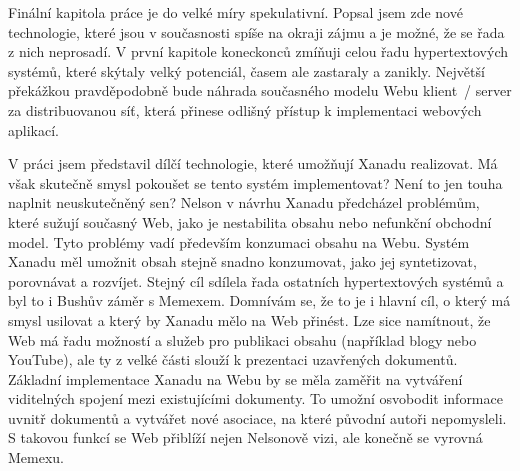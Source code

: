 Finální kapitola práce je do velké míry spekulativní. Popsal jsem zde nové technologie, které jsou v současnosti spíše na okraji zájmu a je možné, že se řada z nich neprosadí. V první kapitole koneckonců zmíňuji celou řadu hypertextových systémů, které skýtaly velký potenciál, časem ale zastaraly a zanikly. Největší překážkou pravděpodobně bude náhrada současného modelu Webu klient~/ server za distribuovanou síť, která přinese odlišný přístup k implementaci webových aplikací.

V práci jsem představil dílčí technologie, které umožňují Xanadu realizovat. Má však skutečně smysl pokoušet se tento systém implementovat? Není to jen touha naplnit neuskutečněný sen?
Nelson v návrhu Xanadu předcházel problémům, které sužují současný Web, jako je nestabilita obsahu nebo nefunkční obchodní model.
Tyto problémy vadí především konzumaci obsahu na Webu.
Systém Xanadu měl umožnit obsah stejně snadno konzumovat, jako jej syntetizovat, porovnávat a rozvíjet. Stejný cíl sdílela řada ostatních hypertextových systémů a byl to i Bushův záměr s Memexem.
Domnívám se, že to je i hlavní cíl, o který má smysl usilovat a který by Xanadu mělo na Web přinést. Lze sice namítnout, že Web má řadu možností a služeb pro publikaci obsahu (například blogy nebo YouTube), ale ty z velké části slouží k prezentaci uzavřených dokumentů.
Základní implementace Xanadu na Webu by se měla zaměřit na vytváření viditelných spojení mezi existujícími dokumenty. To umožní osvobodit informace uvnitř dokumentů a vytvářet nové asociace, na které původní autoři nepomysleli.
S takovou funkcí se Web přiblíží nejen Nelsonově vizi, ale konečně se vyrovná Memexu.



